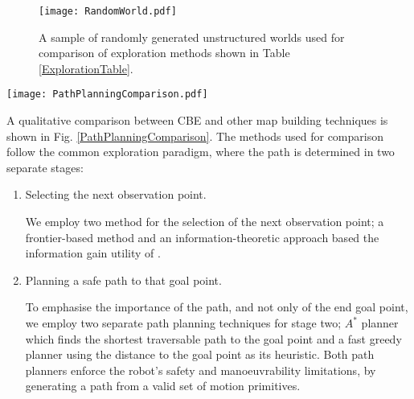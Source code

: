 \documentclass[shortAfour,sageh,times]{sagej_no_sage}
\begin{document}
 \begin{figure}[bt]
 	
 	\centering
 	
 	\texttt{[image: RandomWorld.pdf]}
 	
 	\caption{A sample of randomly generated unstructured worlds used for comparison of exploration methods shown in Table \ref{ExplorationTable}.}
 	\label{RandomWorld}
 \end{figure}
 \begin{figure*}[t]
 	
 	\centering
 	
 	\texttt{[image: PathPlanningComparison.pdf]}
 	
 	\caption{Comparison of simulation results for a randomly generated world (world 3).(left) CBE results, (right) simulation results with two planners for next observation point; Information-theoretic \citep{Makarenko2002} and frontier \citep{Yamauchi1997}, and two smooth safe path planners, greedy and A*. The walls and obstacles are marked with black lines. In the grid map, green is unexplored regions, blue is free space and red occupied. The executed paths are shown as dashed yellow lines. CBE maximises the accumulated information gain at every decision point by avoiding previously traversed paths. In contrast, both information-theoretic and frontier based planners exhibit a clear criss-cross pattern in the executed paths, as both methods only reason on the gains of single goal point.}
 	\label{PathPlanningComparison}
 \end{figure*}

A qualitative comparison between CBE and other map building techniques is shown in Fig. \ref{PathPlanningComparison}. The methods used for comparison follow the common exploration paradigm, where the path is determined in two separate stages: 
\begin{enumerate}[i]
	\item Selecting the next observation point.
	
	We employ two method for the selection of the next observation point;  a frontier-based method \citep{Yamauchi1997} and an information-theoretic approach based the information gain utility of \citep{Makarenko2002}.
	
	\item Planning a safe path to that goal point.
	
	To emphasise the importance of the path, and not only of the end goal point, we employ two separate path planning techniques for stage two; $A^*$ planner which finds the shortest traversable path to the goal point and a fast greedy planner using the distance to the goal point as its heuristic. Both path planners enforce the robot's safety and manoeuvrability limitations, by generating a path from a valid set of motion primitives.   

\end{enumerate}
  
\end{document}
